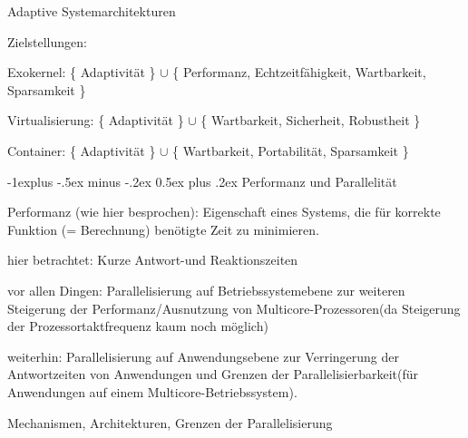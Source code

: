 \documentclass[a4paper]{article}
\makeatletter
\renewcommand{\subsection}{\@startsection{subsection}{2}{0mm}%
 {-1explus -.5ex minus -.2ex}%
 {0.5ex plus .2ex}%
 {\normalfont\normalsize\bfseries}}
\makeatother
\begin{document}
\begin{multicols}{3}
    Adaptive Systemarchitekturen

    \begin{itemize*}
        \item Zielstellungen:
        \begin{itemize*}
            \item Exokernel: \{ Adaptivität \} $\cup$ \{ Performanz, Echtzeitfähigkeit, Wartbarkeit, Sparsamkeit \}
            \item Virtualisierung: \{ Adaptivität \} $\cup$ \{ Wartbarkeit, Sicherheit, Robustheit \}
            \item Container: \{ Adaptivität \} $\cup$ \{ Wartbarkeit, Portabilität, Sparsamkeit \}
        \end{itemize*}
    \end{itemize*}


    \subsection{Performanz und
        Parallelität}

    \begin{itemize*}
        \item Performanz (wie hier besprochen): Eigenschaft eines Systems, die für
        korrekte Funktion (= Berechnung) benötigte Zeit zu minimieren.
        \item hier betrachtet: Kurze Antwort-und Reaktionszeiten
        \begin{enumerate*}

            \item vor allen Dingen: Parallelisierung auf Betriebssystemebene zur weiteren Steigerung der Performanz/Ausnutzung von Multicore-Prozessoren(da Steigerung der Prozessortaktfrequenz kaum noch möglich)
            \item weiterhin: Parallelisierung auf Anwendungsebene zur Verringerung der Antwortzeiten von Anwendungen und Grenzen der Parallelisierbarkeit(für Anwendungen auf einem Multicore-Betriebssystem).
        \end{enumerate*}
    \end{itemize*}

    Mechanismen, Architekturen, Grenzen der Parallelisierung


\end{multicols}
\end{document}
